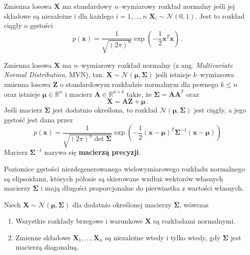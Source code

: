 \documentclass{myclass}
\numberwithin{equation}{subsection}
\begin{document}
\begin{definition}
Zmienna losowa \(\mathbf{X}\) ma standardowy \(n\)--wymiarowy rozkład normalny jeśli jej składowe są
niezależne i dla każdego \(i=1,\ldots,n\) \(\mathbf{X}_i \sim \mathcal{N}(0,1)\). Jest to rozkład
ciągły o gęstości
\begin{equation*}
    p(\mathbf{x}) = \frac{1}{\sqrt{(2\pi)^n}}\exp\left(-\frac{1}{2}\mathbf{x}^T\mathbf{x}\right)\,.
\end{equation*}
\end{definition}

\begin{definition}
Zmienna losowa \(\mathbf{X}\) ma \(n\)--wymiarowy rozkład normalny (z ang. \textit{Multivariate
Normal Distribution}, MVN), tzn. \(\mathbf{X} \sim \mathcal{N}(\boldsymbol{\mu},
\boldsymbol{\Sigma})\) jeśli istnieje \(k\)--wymiarowa zmienna losowa \(\mathbf{Z}\) o standardowym
rozkładzie normalnym dla pewnego \(k \leq n\) oraz istnieje \(\boldsymbol{\mu} \in \mathbb{R}^n\) i
macierz \(\mathbf{A} \in \mathbb{R}^{n \times k}\) takie, że \(\boldsymbol{\Sigma} =
\mathbf{A}\mathbf{A}^T\) oraz
\begin{equation*}
    \mathbf{X} = \mathbf{A}\mathbf{Z} + \boldsymbol{\mu}\,.
\end{equation*}
Jeśli macierz \(\boldsymbol{\Sigma}\) jest dodatnio określona, to rozkład
\(\mathcal{N}(\boldsymbol{\mu}, \boldsymbol{\Sigma})\) jest ciągły, a jego gęstość jest dana przez
\begin{equation*}
    p(\mathbf{x}) = \frac{1}{\sqrt{(2\pi)^n\det\boldsymbol{\Sigma}}}\exp\left(-\frac{1}{2}(\mathbf{x}-\boldsymbol{\mu})^T\boldsymbol{\Sigma}^{-1}(\mathbf{x}-\boldsymbol{\mu})\right)
\end{equation*}
Macierz \(\boldsymbol{\Sigma}^{-1}\) nazywa się \textbf{macierzą precyzji}.
\end{definition}

Poziomice gęstości niezdegenerowanego wielowymiarowego rozkładu normalnego są elipsoidami, których
półosie są skierowane wzdłuż wektorów własnych macierzy \(\boldsymbol{\Sigma}\) i mają długości
proporcjonalne do pierwiastka z wartości własnych.

\begin{theorem}\label{th:mvn}
Niech \(\mathbf{X} \sim \mathcal{N}(\boldsymbol{\mu}, \boldsymbol{\Sigma})\) dla dodatnio określonej
macierzy \(\boldsymbol{\Sigma}\), wówczas
\begin{enumerate}

    \item Wszystkie rozkłady brzegowe i warunkowe \(\mathbf{X}\) są rozkładami normalnymi.

    \item Zmienne składowe \(\mathbf{X}_1,\ldots,\mathbf{X}_n\) są niezależne wtedy i tylko wtedy,
    gdy \(\boldsymbol{\Sigma}\) jest macierzą diagonalną.
    
\end{enumerate}
\end{theorem}
\end{document}
